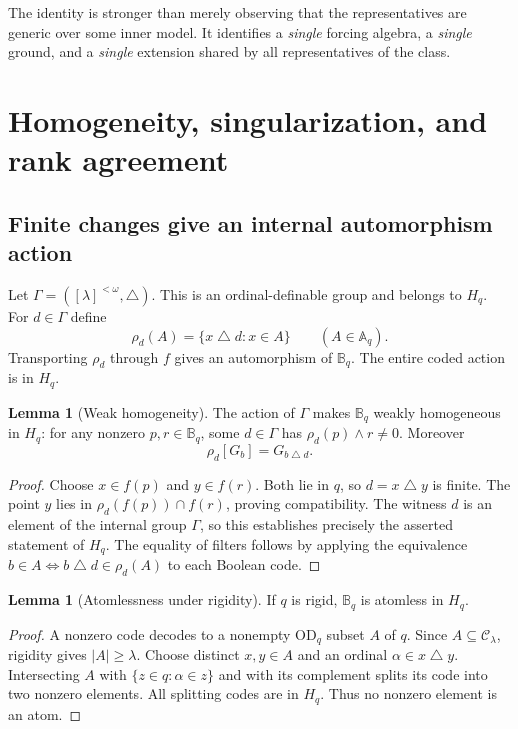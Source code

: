 \documentclass[11pt,letterpaper]{article}
\theoremstyle{definition}
\newtheorem{lemma}[definition]{Lemma}
\numberwithin{equation}{section}
\newcommand{\OD}{\mathrm{OD}}
\newcommand{\Clam}{\mathcal C_\lambda}
\newcommand{\BB}{\mathbb B}
\newcommand{\AlgA}{\mathbb A}
\newcommand{\symdiff}{\mathbin{\triangle}}
\begin{document}
The identity is stronger than merely observing that the representatives
are generic over some inner model. It identifies a \emph{single} forcing
algebra, a \emph{single} ground, and a \emph{single} extension shared by
all representatives of the class.

\section{Homogeneity, singularization, and rank agreement}\label{sec:forcing}

\subsection{Finite changes give an internal automorphism action}

Let $\Gamma=([\lambda]^{<\omega},\symdiff)$. This is an ordinal-definable
group and belongs to $H_q$. For $d\in\Gamma$ define
\[
 \rho_d(A)=\{x\symdiff d:x\in A\}\qquad(A\in\AlgA_q).
\]
Transporting $\rho_d$ through $f$ gives an automorphism of $\BB_q$.
The entire coded action is in $H_q$.

\begin{lemma}[Weak homogeneity]\label{lem:weak}
The action of $\Gamma$ makes $\BB_q$ weakly homogeneous in $H_q$:
for any nonzero $p,r\in\BB_q$, some $d\in\Gamma$ has
$\rho_d(p)\wedge r\ne0$. Moreover
\[
 \rho_d[G_b]=G_{b\symdiff d}.
\]
\end{lemma}
\begin{proof}
Choose $x\in f(p)$ and $y\in f(r)$. Both lie in $q$, so
$d=x\symdiff y$ is finite. The point $y$ lies in
$\rho_d(f(p))\cap f(r)$, proving compatibility. The witness $d$ is an
element of the internal group $\Gamma$, so this establishes precisely
the asserted statement of $H_q$. The equality of filters follows by
applying the equivalence
$b\in A\Longleftrightarrow b\symdiff d\in\rho_d(A)$
to each Boolean code.
\end{proof}

\begin{lemma}[Atomlessness under rigidity]\label{lem:atomless}
If $q$ is rigid, $\BB_q$ is atomless in $H_q$.
\end{lemma}
\begin{proof}
A nonzero code decodes to a nonempty $\OD_q$ subset $A$ of $q$.
Since $A\subseteq\Clam$, rigidity gives $|A|\ge\lambda$.
Choose distinct $x,y\in A$ and an ordinal $\alpha\in x\symdiff y$.
Intersecting $A$ with $\{z\in q:\alpha\in z\}$ and with its complement
splits its code into two nonzero elements. All splitting codes are in
$H_q$. Thus no nonzero element is an atom.
\end{proof}
\end{document}
